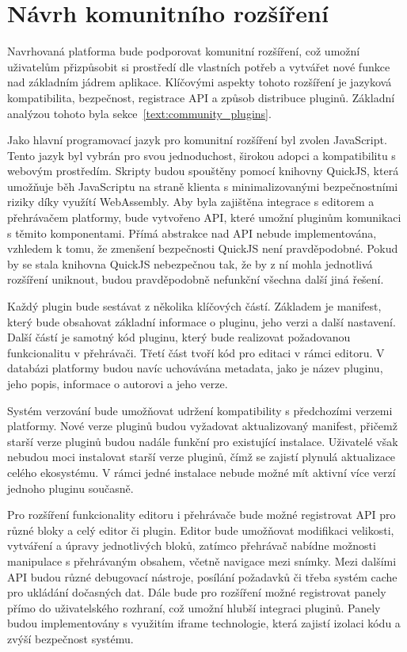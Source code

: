 \section{Návrh komunitního rozšíření}\label{text:navrh/plugins}

Navrhovaná platforma bude podporovat komunitní rozšíření, což umožní uživatelům přizpůsobit si prostředí dle vlastních potřeb a vytvářet nové funkce nad základním jádrem aplikace.
Klíčovými aspekty tohoto rozšíření je jazyková kompatibilita, bezpečnost, registrace API a způsob distribuce pluginů.
Základní analýzou tohoto byla sekce~\ref{text:community_plugins}.

Jako hlavní programovací jazyk pro komunitní rozšíření byl zvolen JavaScript.
Tento jazyk byl vybrán pro svou jednoduchost, širokou adopci a kompatibilitu s webovým prostředím.
Skripty budou spouštěny pomocí knihovny QuickJS, která umožňuje běh JavaScriptu na straně klienta s minimalizovanými bezpečnostními riziky díky využítí WebAssembly.
Aby byla zajištěna integrace s editorem a přehrávačem platformy, bude vytvořeno API, které umožní pluginům komunikaci s těmito komponentami. 
Přímá abstrakce nad API nebude implementována, vzhledem k tomu, že zmenšení bezpečnosti QuickJS není pravděpodobné.
Pokud by se stala knihovna QuickJS nebezpečnou tak, že by z ní mohla jednotlivá rozšíření uniknout, budou pravděpodobně nefunkční všechna další jiná řešení.

Každý plugin bude sestávat z několika klíčových částí. 
Základem je manifest, který bude obsahovat základní informace o pluginu, jeho verzi a další nastavení. 
Další částí je samotný kód pluginu, který bude realizovat požadovanou funkcionalitu v přehrávači. 
Třetí část tvoří kód pro editaci v rámci editoru. 
V databázi platformy budou navíc uchovávána metadata, jako je název pluginu, jeho popis, informace o autorovi a jeho verze.

Systém verzování bude umožňovat udržení kompatibility s předchozími verzemi platformy. 
Nové verze pluginů budou vyžadovat aktualizovaný manifest, přičemž starší verze pluginů budou nadále funkční pro existující instalace. 
Uživatelé však nebudou moci instalovat starší verze pluginů, čímž se zajistí plynulá aktualizace celého ekosystému.
V rámci jedné instalace nebude možné mít aktivní více verzí jednoho pluginu současně.

Pro rozšíření funkcionality editoru i přehrávače bude možné registrovat API pro různé bloky a celý editor či plugin.
Editor bude umožňovat modifikaci velikosti, vytváření a úpravy jednotlivých bloků, zatímco přehrávač nabídne možnosti manipulace s přehrávaným obsahem, včetně navigace mezi snímky.
Mezi dalšími API budou různé debugovací nástroje, posílání požadavků či třeba systém cache pro ukládání dočasných dat.
Dále bude pro rozšíření možné registrovat panely přímo do uživatelského rozhraní, což umožní hlubší integraci pluginů.
Panely budou implementovány s využitím iframe technologie, která zajistí izolaci kódu a zvýší bezpečnost systému.

